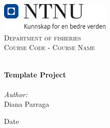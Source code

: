 
\begin{titlepage}
\vbox{ }
\vbox{ }
\begin{center}
\includegraphics[width=0.40\textwidth]{Images/NTNU_logo.png}\\[1cm]
\textsc{\LARGE Department of fisheries}\\[1.5cm]
\textsc{\Large Course Code - Course Name}\\[0.5cm]
\vbox{ }

\HRule \\[0.4cm]
{ \huge \bfseries Template Project}\\[0.4cm]
\HRule \\[1.5cm]

\large
\emph{Author:}\\
Diana Parraga
\vfill

{\large Date}
\end{center}
\end{titlepage}